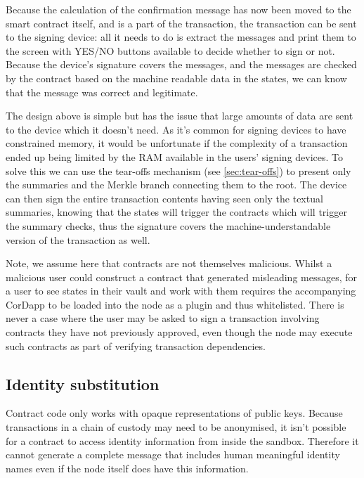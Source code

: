 \documentclass{article}
\begin{document}
Because the calculation of the confirmation message has now been moved to the smart contract itself, and is a part of
the transaction, the transaction can be sent to the signing device: all it needs to do is extract the messages and
print them to the screen with YES/NO buttons available to decide whether to sign or not. Because the device's signature
covers the messages, and the messages are checked by the contract based on the machine readable data in the states, we
can know that the message was correct and legitimate.

The design above is simple but has the issue that large amounts of data are sent to the device which it doesn't need.
As it's common for signing devices to have constrained memory, it would be unfortunate if the complexity of a transaction
ended up being limited by the RAM available in the users' signing devices. To solve this we can use the tear-offs
mechanism (see \cref{sec:tear-offs}) to present only the summaries and the Merkle branch connecting them to the root.
The device can then sign the entire transaction contents having seen only the textual summaries, knowing that the states
will trigger the contracts which will trigger the summary checks, thus the signature covers the machine-understandable
version of the transaction as well.

Note, we assume here that contracts are not themselves malicious. Whilst a malicious user could construct a contract that
generated misleading messages, for a user to see states in their vault and work with them requires the accompanying
CorDapp to be loaded into the node as a plugin and thus whitelisted. There is never a case where the user may be asked
to sign a transaction involving contracts they have not previously approved, even though the node may execute such
contracts as part of verifying transaction dependencies.

\subsection{Identity substitution}

Contract code only works with opaque representations of public keys. Because transactions in a chain of custody may need
to be anonymised, it isn't possible for a contract to access identity information from inside the sandbox. Therefore it
cannot generate a complete message that includes human meaningful identity names even if the node itself does have this
information.
\end{document}
